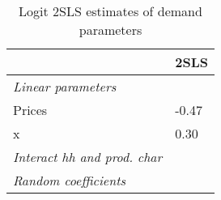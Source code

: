 \begin{table}
\centering
\caption{Logit 2SLS estimates of demand parameters}
\label{tab:logitDemand}
\begin{tabular}{ll}
\toprule
{} &   2SLS \\
\midrule
\emph{Linear parameters}          &        \\
Prices                            &  -0.47 \\
x                                 &   0.30 \\
\emph{Interact hh and prod. char} &        \\
\emph{Random coefficients}        &        \\
\bottomrule
\end{tabular}
\end{table}

